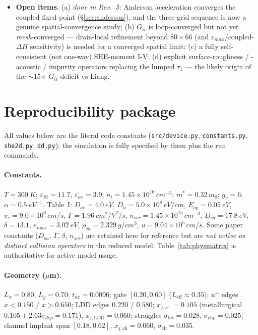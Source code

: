 \documentclass[11pt]{article}
\newcommand{\eps}{\varepsilon}
\begin{document}
\begin{itemize}[leftmargin=1.4em,itemsep=2pt]
demonstrated (if not yet self-consistent) reproduction of Liang's I-V method.
\item \textbf{Open items.} (a) \emph{done in Rev.~5:} Anderson acceleration converges the coupled
fixed point (\S\ref{sec:anderson}), and the three-grid sequence is now a genuine spatial-convergence
study; (b) $G_{ii}$ is loop-converged but not yet \emph{mesh}-converged --- drain-local refinement
beyond $80{\times}66$ (and $\eps_{max}$/coupled-$\Delta H$ sensitivity) is needed for a converged
spatial limit; (c) a fully self-consistent (not one-way) SHE-moment I-V; (d) explicit
surface-roughness / -acoustic / impurity operators replacing the lumped $\tau_1$ --- the likely
origin of the $\sim$15$\times$ $G_{ii}$ deficit vs Liang.
\end{itemize}

\appendix
\section{Reproducibility package}\label{sec:specs}
All values below are the literal code constants (\texttt{src/device.py}, \texttt{constants.py},
\texttt{she2d.py}, \texttt{dd.py}); the simulation is fully specified by them plus the run commands.

\paragraph{Constants.} $T=\SI{300}{K}$; $\eps_{Si}=11.7$, $\eps_{ox}=3.9$;
$n_i=1.45\times10^{10}\,\si{cm^{-3}}$; $m^*=0.32\,m_0$; $g_v=6$; $\alpha=\SI{0.5}{eV^{-1}}$.
Table~I: $D_{ac}=\SI{4.0}{eV}$, $D_n=5.0\times10^{8}\,\si{eV/cm}$, $E_{op}=\SI{0.05}{eV}$,
$v_s=9.0\times10^{6}\,\si{cm/s}$, $\Gamma=\SI{1.96}{cm^2/V^2/s}$,
$n_{scr}=1.45\times10^{15}\,\si{cm^{-3}}$, $D_{sa}=\SI{17.8}{eV}$, $\delta=13.1$,
$\eps_{max}=\SI{3.02}{eV}$, $\rho_{Si}=\SI{2.329}{g/cm^3}$, $u=9.04\times10^{5}\,\si{cm/s}$.
Some paper constants ($D_{sa}$, $\Gamma$, $\delta$, $n_{scr}$) are retained here for reference but
are \emph{not active as distinct collision operators} in the reduced model; Table~\ref{tab:physmatrix}
is authoritative for active model usage.

\paragraph{Geometry ($\mu$m).} $L_x=0.80$, $L_y=0.70$; $t_{ox}=0.0096$; gate $[0.20,0.60]$
($L_{\text{eff}}\!\approx\!0.35$); n$^+$ edges $x{<}0.150$ / $x{>}0.650$; LDD edges $0.220$ /
$0.580$; $x_{j,n^+}=0.105$ (metallurgical $0.105{+}2.63\sigma_{dep}=0.171$),
$x_{j,\text{LDD}}=0.060$; straggles $\sigma_{lat}=0.028$, $\sigma_{dep}=0.025$; channel implant
span $[0.18,0.62]$, $x_{j,\text{ch}}=0.060$, $\sigma_{\text{ch}}=0.035$.
\end{document}
